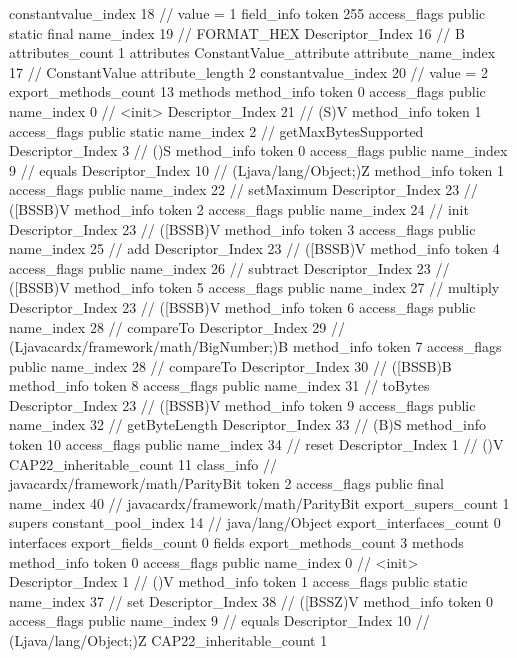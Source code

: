 {{{{{{{					constantvalue_index	18		// value = 1
				}
				}
			}
			field_info {
				token	255
				access_flags	public static final
				name_index	19		// FORMAT_HEX
				Descriptor_Index	16		// B
				attributes_count	1
				attributes {
				ConstantValue_attribute {
					attribute_name_index	17		// ConstantValue
					attribute_length	2
					constantvalue_index	20		// value = 2
				}
				}
			}
			}
			export_methods_count	13
			methods {
				method_info {
					token	0
					access_flags	public
					name_index	0		// <init>
					Descriptor_Index	21		// (S)V
				}
				method_info {
					token	1
					access_flags	public static
					name_index	2		// getMaxBytesSupported
					Descriptor_Index	3		// ()S
				}
				method_info {
					token	0
					access_flags	public
					name_index	9		// equals
					Descriptor_Index	10		// (Ljava/lang/Object;)Z
				}
				method_info {
					token	1
					access_flags	public
					name_index	22		// setMaximum
					Descriptor_Index	23		// ([BSSB)V
				}
				method_info {
					token	2
					access_flags	public
					name_index	24		// init
					Descriptor_Index	23		// ([BSSB)V
				}
				method_info {
					token	3
					access_flags	public
					name_index	25		// add
					Descriptor_Index	23		// ([BSSB)V
				}
				method_info {
					token	4
					access_flags	public
					name_index	26		// subtract
					Descriptor_Index	23		// ([BSSB)V
				}
				method_info {
					token	5
					access_flags	public
					name_index	27		// multiply
					Descriptor_Index	23		// ([BSSB)V
				}
				method_info {
					token	6
					access_flags	public
					name_index	28		// compareTo
					Descriptor_Index	29		// (Ljavacardx/framework/math/BigNumber;)B
				}
				method_info {
					token	7
					access_flags	public
					name_index	28		// compareTo
					Descriptor_Index	30		// ([BSSB)B
				}
				method_info {
					token	8
					access_flags	public
					name_index	31		// toBytes
					Descriptor_Index	23		// ([BSSB)V
				}
				method_info {
					token	9
					access_flags	public
					name_index	32		// getByteLength
					Descriptor_Index	33		// (B)S
				}
				method_info {
					token	10
					access_flags	public
					name_index	34		// reset
					Descriptor_Index	1		// ()V
				}
			}
			CAP22_inheritable_count	11
		}
		class_info {		// javacardx/framework/math/ParityBit
			token	2
			access_flags	public final
			name_index	40		// javacardx/framework/math/ParityBit
			export_supers_count	1
			supers {
				constant_pool_index	14		// java/lang/Object
			}
			export_interfaces_count	0
			interfaces {
			}
			export_fields_count	0
			fields {
			}
			export_methods_count	3
			methods {
				method_info {
					token	0
					access_flags	public
					name_index	0		// <init>
					Descriptor_Index	1		// ()V
				}
				method_info {
					token	1
					access_flags	public static
					name_index	37		// set
					Descriptor_Index	38		// ([BSSZ)V
				}
				method_info {
					token	0
					access_flags	public
					name_index	9		// equals
					Descriptor_Index	10		// (Ljava/lang/Object;)Z
				}
			}
			CAP22_inheritable_count	1
		}
	}
}
